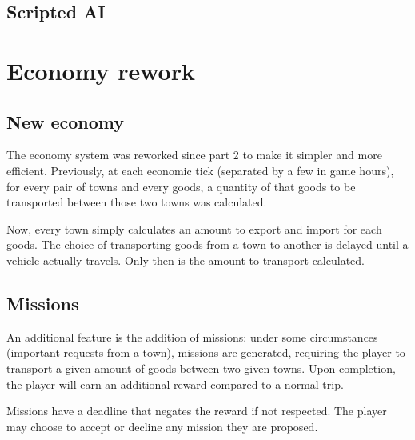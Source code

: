 \documentclass{article}
\begin{document}
\subsection{Scripted AI}


\section{Economy rework}
\subsection{New economy}
The economy system was reworked since part 2 to make it simpler and more efficient.
Previously, at each economic tick (separated by a few in game hours), for every
pair of towns and every goods, a quantity of that goods to be transported
between those two towns was calculated.

Now, every town simply calculates an amount to export and import for each goods.
The choice of transporting goods from a town to another is delayed until a
vehicle actually travels. Only then is the amount to transport calculated.

\subsection{Missions}
An additional feature is the addition of missions: under some circumstances
(important requests from a town), missions are generated, requiring the player
to transport a given amount of goods between two given towns. Upon completion,
the player will earn an additional reward compared to a normal trip.

Missions have a deadline that negates the reward if not respected. The player
may choose to accept or decline any mission they are proposed.
\end{document}
